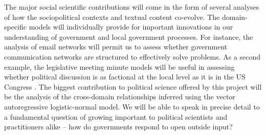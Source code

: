 The major social scientific contributions will come in the form of several analyses of how the sociopolitical contexts and textual content co-evolve. The domain-specific models will individually provide for important innovations in our understanding of government and local government processes. For instance, the analysis of email networks will permit us to assess whether government communication networks are structured to effectively solve problems. As a second example, the legislative meeting minute models will be useful in assessing whether political discussion is as factional at the local level as it is in the US Congress \cite{Harbridge2011}. The biggest contribution to political science offered by this project will be the analysis of the cross-domain relationships inferred using the vector autoregressive logistic-normal model. We will be able to speak in precise detail to a fundamental question of growing important to political scientists and practitioners alike -- how do governments respond to open outside input?






